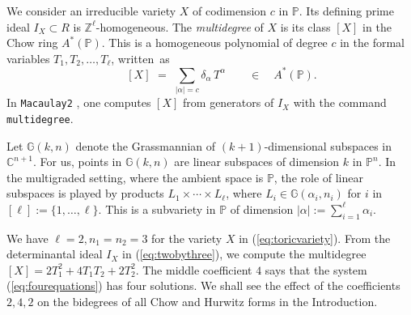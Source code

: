 \documentclass[12pt]{article}
\theoremstyle{definition}
\newenvironment{example}
{\pushQED{\qed}\renewcommand{\qedsymbol}{$\diamond$}\examplex}
{\popQED\endexamplex}
\newcommand{\bC}{\mathbb C}
\newcommand{\bZ}{\mathbb Z}
\newcommand{\bG}{\mathbb G}
\newcommand{\bP}{\mathbb P}
\begin{document}
We consider an irreducible variety $X$ of codimension $c$ in $\bP$.
Its defining prime ideal $I_X \subset R$ is $\bZ^\ell$-homogeneous.
The {\em multidegree} of $X$ is its class $[X]$ in the Chow ring $A^*(\bP)$.
This is a homogeneous polynomial of degree $c$ in the formal variables $T_1,T_2,\ldots,T_\ell$, written~as
\begin{equation}
\label{eq:multidegree}
\qquad    [X] \,\, = \,\, \sum_{|\alpha|=c} \delta_\alpha\,T^{\alpha} \qquad \in \quad A^*(\bP).
\end{equation}
In {\tt Macaulay2} \cite{M2},
one computes $[X]$ from generators of $I_X$  with the command
{\tt multidegree}.

Let $\bG(k,n)$ denote the Grassmannian of $(k+1)$-dimensional subspaces in $\bC^{n+1}$.
For us, points in $\bG(k,n)$ are linear subspaces of dimension $k$ in $\bP^n$.
In the multigraded setting, where the ambient space is $\bP$, the role of linear subspaces is
played by products $L_1 \times \cdots \times L_\ell$, where
$L_i \in \bG(\alpha_i,n_i)$ for $i$ in $ [\ell] := \{1,\ldots,\ell\}$.
This is a subvariety in $\bP$ of dimension $|\alpha| := \sum_{i=1}^\ell \alpha_i$.

\begin{example}[Toric $4$-fold] \label{ex:toric4fold}
We have $\ell=2,n_1=n_2=3$ for the variety $X$ in (\ref{eq:toricvariety}). From the
determinantal ideal $I_X$ in (\ref{eq:twobythree}), we compute the multidegree
$[X] =  2 T_1^2 + 4 T_1 T_2 + 2 T_2^2$. The middle coefficient $4$
says that the system (\ref{eq:fourequations}) has four solutions.
We shall see the effect of the coefficients $2,4,2$ on 
the bidegrees of all Chow and Hurwitz forms in the Introduction.
\end{example}
\end{document}
